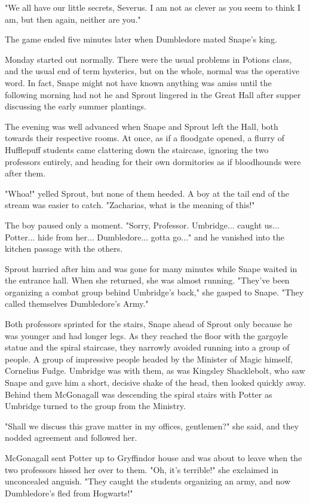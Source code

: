 \documentclass[a4paper,11pt]{article}
\begin{document}
"We all have our little secrets, Severus. I am not as clever as you seem to think I am, but then again, neither are you."

The game ended five minutes later when Dumbledore mated Snape's king.

Monday started out normally. There were the usual problems in Potions class, and the usual end of term hysterics, but on the whole, normal was the operative word. In fact, Snape might not have known anything was amiss until the following morning had not he and Sprout lingered in the Great Hall after supper discussing the early summer plantings.

The evening was well advanced when Snape and Sprout left the Hall, both towards their respective rooms. At once, as if a floodgate opened, a flurry of Hufflepuff students came clattering down the staircase, ignoring the two professors entirely, and heading for their own dormitories as if bloodhounds were after them.

"Whoa!" yelled Sprout, but none of them heeded. A boy at the tail end of the stream was easier to catch. "Zacharias, what is the meaning of this!"

The boy paused only a moment. "Sorry, Professor. Umbridge... caught us... Potter... hide from her... Dumbledore... gotta go..." and he vanished into the kitchen passage with the others.

Sprout hurried after him and was gone for many minutes while Snape waited in the entrance hall. When she returned, she was almost running. "They've been organizing a combat group behind Umbridge's back," she gasped to Snape. "They called themselves Dumbledore's Army."

Both professors sprinted for the stairs, Snape ahead of Sprout only because he was younger and had longer legs. As they reached the floor with the gargoyle statue and the spiral staircase, they narrowly avoided running into a group of people. A group of impressive people headed by the Minister of Magic himself, Cornelius Fudge. Umbridge was with them, as was Kingsley Shacklebolt, who saw Snape and gave him a short, decisive shake of the head, then looked quickly away. Behind them McGonagall was descending the spiral stairs with Potter as Umbridge turned to the group from the Ministry.

"Shall we discuss this grave matter in my offices, gentlemen?" she said, and they nodded agreement and followed her.

McGonagall sent Potter up to Gryffindor house and was about to leave when the two professors hissed her over to them. "Oh, it's terrible!" she exclaimed in unconcealed anguish. "They caught the students organizing an army, and now Dumbledore's fled from Hogwarts!"
\end{document}
